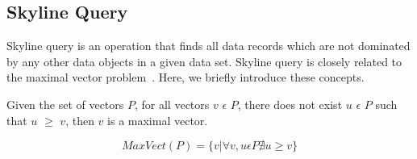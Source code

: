 
\subsection{Skyline Query}\label{sec:skyline_operator}

Skyline query is an operation that finds all data records which
are not dominated by any other data objects in a given data set.
Skyline query is closely related to the maximal vector
problem~\cite{Kung75onfinding,conf/vldb/GodfreySG05}. Here, we
briefly introduce these concepts.







\begin{definition}\label{def:max_vector}
Given the set of vectors $P$, for all vectors $v$ $\epsilon$ $P$,
there does not exist $u$ $\epsilon$ $P$ such that $u$ $\geq$ $v$,
then $v$ is a maximal vector.

\begin{equation}\label{eq:max_vector}
    MaxVect(P) = \{v | \forall v, u \epsilon P \nexists u \geq v\}
\end{equation}

\end{definition}


